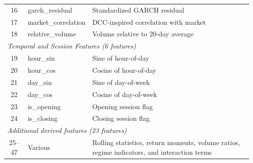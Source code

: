 \begin{table}[h!]
\begin{tabular}{clp{7cm}}
16 & garch\_residual & Standardized GARCH residual \\
17 & market\_correlation & DCC-inspired correlation with market \\
18 & relative\_volume & Volume relative to 20-day average \\
\hline
\multicolumn{3}{l}{\emph{Temporal and Session Features (6 features)}} \\
19 & hour\_sin & Sine of hour-of-day \\
20 & hour\_cos & Cosine of hour-of-day \\
21 & day\_sin & Sine of day-of-week \\
22 & day\_cos & Cosine of day-of-week \\
23 & is\_opening & Opening session flag \\
24 & is\_closing & Closing session flag \\
\hline
\multicolumn{3}{l}{\emph{Additional derived features (23 features)}} \\
25--47 & Various & Rolling statistics, return moments, volume ratios, regime indicators, and interaction terms \\
\hline
\end{tabular}
\end{table}
